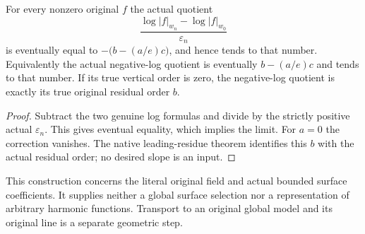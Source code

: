 \begin{corollary}
\label{cor:gauss-surface-actual-fixed-radius-log-quotient}
\leanok
\leavevmode\par
{}
For every nonzero original $f$ the actual quotient
\[
 \frac{\log|f|_{w_n}-\log|f|_{w_0}}{\varepsilon_n}
\]
is eventually equal to $-\bigl(b-(a/e)c\bigr)$, and hence tends to that
number. Equivalently the actual negative-log quotient is eventually
$b-(a/e)c$ and tends to that number. If its true vertical order is zero,
the negative-log quotient
is exactly its true original residual order $b$.
\end{corollary}
\begin{proof}
Subtract the two genuine log formulas and divide by the strictly
positive actual $\varepsilon_n$. This gives eventual equality, which
implies the limit. For $a=0$ the correction vanishes. The native
leading-residue theorem identifies this $b$ with the actual residual
order; no desired slope is an input.
\end{proof}

This construction concerns the literal original field and actual bounded
surface coefficients. It supplies neither a global surface selection nor
a representation of arbitrary harmonic functions. Transport to an
original global model and its original line is a separate geometric step.
